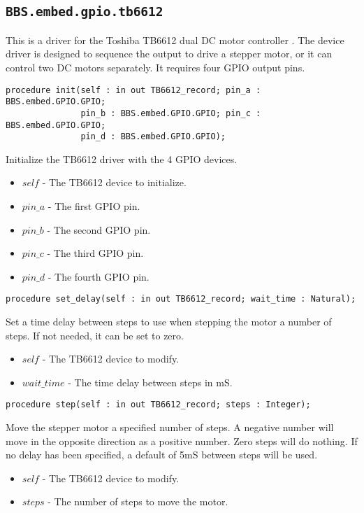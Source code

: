 \documentclass[10pt, openany]{book}
\newcommand{\indexfunc}[1]{\index[func]{#1}}
\newcommand{\package}[1]{\texttt{#1}}
\begin{document}
\subsection{\package{BBS.embed.gpio.tb6612}}
This is a driver for the Toshiba TB6612 dual DC motor controller \cite{TB6612}.  The device driver is designed to sequence the output to drive a stepper motor, or it can control two DC motors separately.  It requires four GPIO output pins.

\begin{lstlisting}
procedure init(self : in out TB6612_record; pin_a : BBS.embed.GPIO.GPIO;
               pin_b : BBS.embed.GPIO.GPIO; pin_c : BBS.embed.GPIO.GPIO;
               pin_d : BBS.embed.GPIO.GPIO);
\end{lstlisting}
\indexfunc{init}
Initialize the TB6612 driver with the 4 GPIO devices.
\begin{itemize}
  \item $self$ - The TB6612 device to initialize.
  \item $pin\_a$ - The first GPIO pin.
  \item $pin\_b$ - The second GPIO pin.
  \item $pin\_c$ - The third GPIO pin.
  \item $pin\_d$ - The fourth GPIO pin.
\end{itemize}

\begin{lstlisting}
procedure set_delay(self : in out TB6612_record; wait_time : Natural);
\end{lstlisting}
\indexfunc{set\_delay}
Set a time delay between steps to use when stepping the motor a number of steps.  If not needed, it can be set to zero.
\begin{itemize}
  \item $self$ - The TB6612 device to modify.
  \item $wait\_time$ - The time delay between steps in mS.
\end{itemize}

\begin{lstlisting}
procedure step(self : in out TB6612_record; steps : Integer);
\end{lstlisting}
\indexfunc{step}
Move the stepper motor a specified number of steps.  A negative number will move in the opposite direction as a positive number.  Zero steps will do nothing.  If no delay has been specified, a default of 5mS between steps will be used.
\begin{itemize}
  \item $self$ - The TB6612 device to modify.
  \item $steps$ - The number of steps to move the motor.
\end{itemize}
\end{document}
